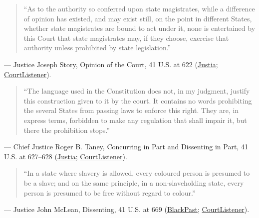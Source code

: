 \documentclass[12pt]{article}
\begin{document}
\begin{quote}
``As to the authority so conferred upon state magistrates, while a difference of opinion has existed, and may exist still, on the point in different States, whether state magistrates are bound to act under it, none is entertained by this Court that state magistrates may, if they choose, exercise that authority unless prohibited by state legislation.''
\end{quote}
\noindent --- Justice Joseph Story, Opinion of the Court, 41 U.S. at 622 (\href{https://supreme.justia.com/cases/federal/us/41/539/}{Justia}; \href{https://www.courtlistener.com/opinion/86231/prigg-v-pennsylvania/}{CourtListener}).

\begin{quote}
``The language used in the Constitution does not, in my judgment, justify this construction given to it by the court. It contains no words prohibiting the several States from passing laws to enforce this right. They are, in express terms, forbidden to make any regulation that shall impair it, but there the prohibition stops.''
\end{quote}
\noindent --- Chief Justice Roger B. Taney, Concurring in Part and Dissenting in Part, 41 U.S. at 627--628 (\href{https://supreme.justia.com/cases/federal/us/41/539/}{Justia}; \href{https://www.courtlistener.com/opinion/86231/prigg-v-pennsylvania/}{CourtListener}).

\begin{quote}
``In a state where slavery is allowed, every coloured person is presumed to be a slave; and on the same principle, in a non-slaveholding state, every person is presumed to be free without regard to colour.''
\end{quote}
\noindent --- Justice John McLean, Dissenting, 41 U.S. at 669 (\href{https://blackpast.org/african-american-history/prigg-v-pennsylvania-1842/}{BlackPast}; \href{https://www.courtlistener.com/opinion/86231/prigg-v-pennsylvania/}{CourtListener}).
\end{document}
